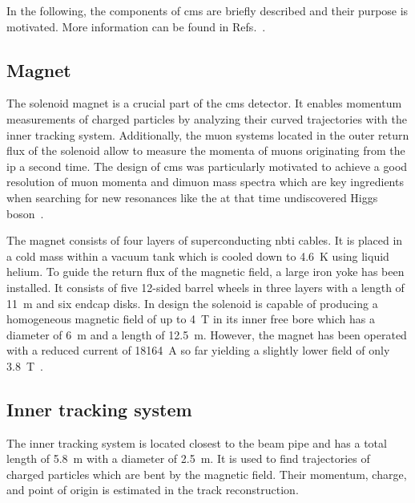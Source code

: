 In the following, the components of \gls{cms} are briefly described and their purpose is motivated. More information can be found in Refs.~\cite{Chatrchyan:2008aa,Bayatian:922757}.


\subsection{Magnet}

The solenoid magnet is a crucial part of the \gls{cms} detector. It enables momentum measurements of charged particles by analyzing their curved trajectories with the inner tracking system. Additionally, the muon systems located in the outer return flux of the solenoid allow to measure the momenta of muons originating from the \gls{ip} a second time. The design of \gls{cms} was particularly motivated to achieve a good resolution of muon momenta and dimuon mass spectra which are key ingredients when searching for new resonances like the at that time undiscovered Higgs boson~\cite{Acquistapace:1997fm}.

The magnet consists of four layers of superconducting \gls{nbti} cables. It is placed in a cold mass within a vacuum tank which is cooled down to 4.6~K using liquid helium. To guide the return flux of the magnetic field, a large iron yoke has been installed. It consists of five 12-sided barrel wheels in three layers with a length of 11~m and six endcap disks. In design the solenoid is capable of producing a homogeneous magnetic field of up to 4~T in its inner free bore which has a diameter of 6~m and a length of 12.5~m. However, the magnet has been operated with a reduced current of 18164~A so far yielding a slightly lower field of only 3.8~T~\cite{Chatrchyan:2009si}. 



\subsection{Inner tracking system}
\label{sec:experiment-tracker}

The inner tracking system is located closest to the beam pipe and has a total length of 5.8~m with a diameter of 2.5~m. It is used to find trajectories of charged particles which are bent by the magnetic field. Their momentum, charge, and point of origin is estimated in the track reconstruction.

